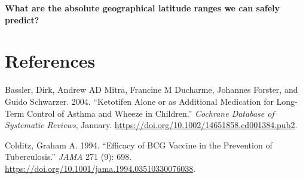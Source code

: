 \documentclass[]{article}
\begin{document}
\newline 

\textbf{What are the absolute geographical latitude ranges we can safely
predict?}

\newline 

\newline 

\newline 

\newline 

\newline 

\newpage

\hypertarget{references}{%
\section*{References}\label{references}}

\hypertarget{refs}{}
\leavevmode\hypertarget{ref-Bassler_2004}{}%
Bassler, Dirk, Andrew AD Mitra, Francine M Ducharme, Johannes Forster,
and Guido Schwarzer. 2004. ``Ketotifen Alone or as Additional Medication
for Long-Term Control of Asthma and Wheeze in Children.'' \emph{Cochrane
Database of Systematic Reviews}, January.
\url{https://doi.org/10.1002/14651858.cd001384.pub2}.

\leavevmode\hypertarget{ref-Colditz_1994}{}%
Colditz, Graham A. 1994. ``Efficacy of BCG Vaccine in the Prevention of
Tuberculosis.'' \emph{JAMA} 271 (9): 698.
\url{https://doi.org/10.1001/jama.1994.03510330076038}.
\end{document}
